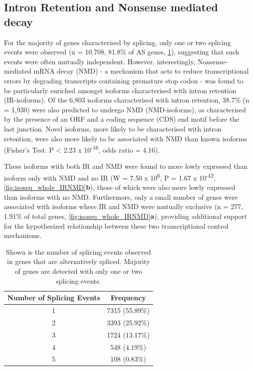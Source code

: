 \subsection{Intron Retention and Nonsense mediated decay}
For the majority of genes characterised by splicing, only one or two splicing events were observed (n = 10,708, 81.8\% of AS genes, \cref{tab:AS_events_spliced}), suggesting that such events were often mutually independent. However, interestingly, Nonsense-mediated mRNA decay (NMD) - a mechanism that acts to reduce transcriptional errors by degrading transcripts containing premature stop codon - was found to be particularly enriched amongst isoforms characterised with intron retention (IR-isoforms). Of the 6,803 isoforms characterised with intron retention, 38.7\% (n = 1,930) were also predicted to undergo NMD (NMD-isoforms), as characterised by the presence of an ORF and a coding sequence (CDS) end motif before the last junction. Novel isoforms, more likely to be characterised with intron retention, were also more likely to be associated with NMD than known isoforms (Fisher's Test: P < 2.23 x 10\textsuperscript{-16}, odds ratio = 4.16). 

These isoforms with both IR and NMD were found to more lowly expressed than isoform only with NMD and no IR (W = 7.50 x 10\textsuperscript{6}, P = 1.67 x 10\textsuperscript{-42}, \cref{fig:isoseq_whole_IRNMD}\textbf{b}), those of which were also more lowly expressed than isoforms with no NMD. Furthermore, only a small number of genes were associated with isoforms where IR and NMD were mutually exclusive (n = 277, 1.91\% of total genes, \cref{fig:isoseq_whole_IRNMD}\textbf{a}), providing additional support for the hypothesized relationship between these two transcriptional control mechanisms.

\begin{table}[ht]
	\centering
	\begin{tabularx}{0.6\textwidth}{cc}
		\toprule
		Number of Splicing Events & Frequency \\ \midrule
		1                           & 7315 (55.89\%)                \\
		2                           & 3393 (25.92\%)                \\
		3                           & 1724 (13.17\%)                \\
		4                           & 548 (4.19\%)                  \\
		5                           & 108 (0.83\%)                  \\ \bottomrule
	\end{tabularx}
	\caption[Number of Splicing Events]%
	{Shown is the number of splicing events observed in genes that are alternatively spliced. Majority of genes are detected with only one or two splicing events.}
	\label{tab:AS_events_spliced}
\end{table}


